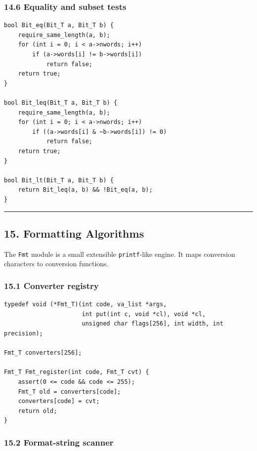 \documentclass[11pt]{article}
\begin{document}
\subsubsection{14.6 Equality and subset tests}\label{equality-and-subset-tests}

\begin{verbatim}
bool Bit_eq(Bit_T a, Bit_T b) {
    require_same_length(a, b);
    for (int i = 0; i < a->nwords; i++)
        if (a->words[i] != b->words[i])
            return false;
    return true;
}

bool Bit_leq(Bit_T a, Bit_T b) {
    require_same_length(a, b);
    for (int i = 0; i < a->nwords; i++)
        if ((a->words[i] & ~b->words[i]) != 0)
            return false;
    return true;
}

bool Bit_lt(Bit_T a, Bit_T b) {
    return Bit_leq(a, b) && !Bit_eq(a, b);
}
\end{verbatim}

\begin{center}\rule{0.5\linewidth}{0.5pt}\end{center}

\subsection{15. Formatting Algorithms}\label{formatting-algorithms}

The \texttt{Fmt} module is a small extensible \texttt{printf}-like engine. It maps conversion characters to conversion functions.

\subsubsection{15.1 Converter registry}\label{converter-registry}

\begin{verbatim}
typedef void (*Fmt_T)(int code, va_list *args,
                      int put(int c, void *cl), void *cl,
                      unsigned char flags[256], int width, int precision);

Fmt_T converters[256];

Fmt_T Fmt_register(int code, Fmt_T cvt) {
    assert(0 <= code && code <= 255);
    Fmt_T old = converters[code];
    converters[code] = cvt;
    return old;
}
\end{verbatim}

\subsubsection{15.2 Format-string scanner}\label{format-string-scanner}
\end{document}
